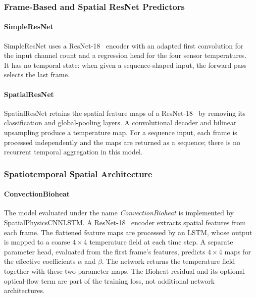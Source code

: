 \subsubsection{Frame-Based and Spatial ResNet Predictors}

\paragraph{SimpleResNet}
SimpleResNet uses a ResNet-18~\cite{he2016deep} encoder with an adapted first convolution for
the input channel count and a regression head for the four sensor
temperatures. It has no temporal state: when given a sequence-shaped input,
the forward pass selects the last frame.

\paragraph{SpatialResNet}
SpatialResNet retains the spatial feature maps of a ResNet-18~\cite{he2016deep} by removing its
classification and global-pooling layers. A convolutional decoder and
bilinear upsampling produce a temperature map. For a sequence input, each
frame is processed independently and the maps are returned as a sequence;
there is no recurrent temporal aggregation in this model.

\subsubsection{Spatiotemporal Spatial Architecture}

\paragraph{ConvectionBioheat}
The model evaluated under the name \emph{ConvectionBioheat} is implemented by
SpatialPhysicsCNNLSTM. A ResNet-18~\cite{he2016deep} encoder extracts spatial features from
each frame. The flattened feature maps are processed by an LSTM, whose output
is mapped to a coarse $4\times4$ temperature field at each time step. A
separate parameter head, evaluated from the first frame's features, predicts
$4\times4$ maps for the effective coefficients $\alpha$ and $\beta$. The
network returns the temperature field together with these two parameter
maps. The Bioheat residual and its optional optical-flow term are part of the
training loss, not additional network architectures.

